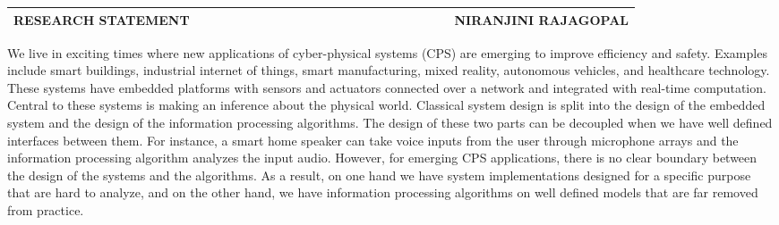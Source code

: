 \documentclass[10pt]{article}
\date{}
\begin{document}

\begin{table}
\color{blue}
\begin{tabular*}{\textwidth}{l r}
\large\textbf{RESEARCH STATEMENT} & 
\hfill \ \ \ \ \ \ \ \ \ \ \ \ \ \ \ \ \ \ \ \
\ \ \ \ \ \ \ \ \ \ \ \ \ \ \ 
\large\textbf{NIRANJINI RAJAGOPAL}\\
\hline
\end{tabular*}

\end{table}


We live in exciting times where new applications of cyber-physical systems
(CPS) are emerging to improve efficiency and safety. Examples include smart buildings, industrial internet of things, smart manufacturing, mixed reality, autonomous vehicles, and healthcare technology. These systems have embedded platforms with sensors and actuators connected over a network and integrated with real-time computation. Central to these systems is making an inference about the physical world. Classical system design is split into the design of the embedded system and the design of the information processing algorithms.
The design of these two parts can be decoupled when we have well defined interfaces between them. For instance, a smart home speaker can take voice inputs from the user through microphone arrays and the information processing algorithm analyzes the input audio.  However, for emerging CPS applications, there is no clear boundary between the design of the systems and the algorithms. 
As a result, on one hand we have system implementations designed for a specific purpose that are hard to analyze, and on the other hand, we have information processing algorithms on well defined models that are far removed from practice.\\
\end{document}
